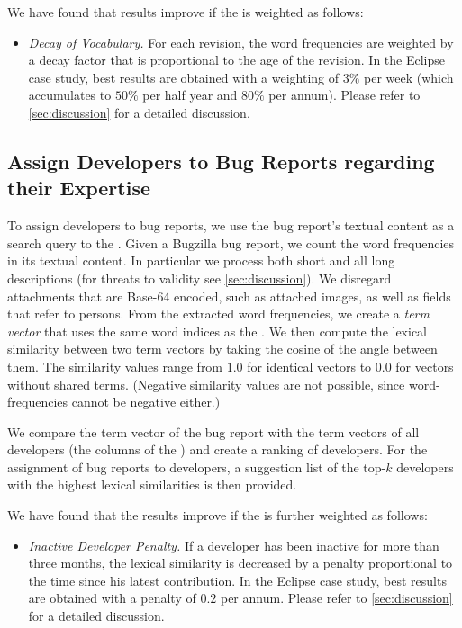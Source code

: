 We have found that results improve if the \TAM is weighted as follows:

\begin{itemize}
\item \emph{Decay of Vocabulary.} For each revision, the word frequencies are weighted by a decay factor that is proportional to the age of the revision. In the Eclipse case study, best results are obtained with a weighting of $3\%$ per week (which accumulates to $50\%$ per half year and $80\%$ per annum). Please refer to \autoref{sec:discussion} for a detailed discussion.
\end{itemize}

\subsection{Assign Developers to Bug Reports regarding their Expertise}

To assign developers to bug reports, we use the bug report's textual content as a search query to the \TAM.
Given a Bugzilla bug report, we count the word frequencies in its textual content. In particular we process both short and all long descriptions (for threats to validity see \autoref{sec:discussion}).
We disregard attachments that are Base-64 encoded, such as attached images, as well as fields that refer to persons. From the extracted word frequencies, we create a \emph{term vector} that uses the same word indices as the \TAM. %
We then compute the lexical similarity between two term vectors by taking the cosine of the angle between them.
The similarity values range from $1.0$ for identical vectors to $0.0$ for vectors without shared terms. (Negative similarity values are not possible, since word-frequencies cannot be negative either.)

We compare the term vector of the bug report with the term vectors of all developers (\ie the columns of the \TAM) and create a ranking of developers. For the assignment of bug reports to developers, a suggestion list of the top-$k$ developers with the highest lexical similarities is then provided.

We have found that the results improve if the \TAM is further weighted as follows:
\begin{itemize}
\item \emph{Inactive Developer Penalty.} If a developer has been inactive for more than three months, the lexical similarity is decreased by a penalty proportional to the time since his latest contribution. In the Eclipse case study, best results are obtained with a penalty of $0.2$ per annum. Please refer to \autoref{sec:discussion} for a detailed discussion.
\end{itemize}

